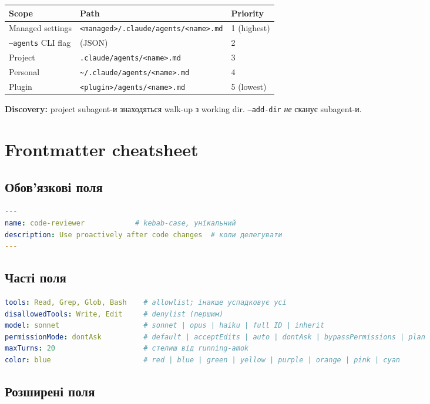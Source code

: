 \documentclass[11pt,a4paper]{article}
\begin{document}
\begin{tabular}{lll}
\hline
\textbf{Scope} & \textbf{Path} & \textbf{Priority} \\
\hline
Managed settings & \texttt{<managed>/.claude/agents/<name>.md} & 1 (highest) \\
\texttt{--agents} CLI flag & (JSON) & 2 \\
Project & \texttt{.claude/agents/<name>.md} & 3 \\
Personal & \texttt{\textasciitilde/.claude/agents/<name>.md} & 4 \\
Plugin & \texttt{<plugin>/agents/<name>.md} & 5 (lowest) \\
\hline
\end{tabular}

\textbf{Discovery:} project subagent-и знаходяться walk-up з working dir. \texttt{--add-dir} \emph{не} сканує subagent-и.

\section{Frontmatter cheatsheet}

\subsection{Обов'язкові поля}

\begin{lstlisting}[language=yaml]
---
name: code-reviewer            # kebab-case, унікальний
description: Use proactively after code changes  # коли делегувати
---
\end{lstlisting}

\subsection{Часті поля}

\begin{lstlisting}[language=yaml]
tools: Read, Grep, Glob, Bash    # allowlist; інакше успадковує усі
disallowedTools: Write, Edit     # denylist (першим)
model: sonnet                    # sonnet | opus | haiku | full ID | inherit
permissionMode: dontAsk          # default | acceptEdits | auto | dontAsk | bypassPermissions | plan
maxTurns: 20                     # стелиш від running-amok
color: blue                      # red | blue | green | yellow | purple | orange | pink | cyan
\end{lstlisting}

\subsection{Розширені поля}
\end{document}
